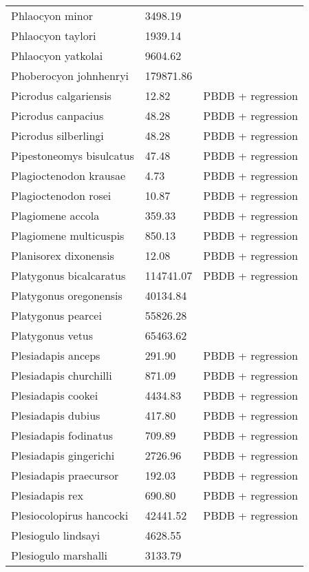 \documentclass{article}
\begin{document}
\begin{center}
\begin{longtable}{p{} p{} p{} }
  Phlaocyon minor & 3498.19 & \cite{Tomiya2013} \\ 
  Phlaocyon taylori & 1939.14 & \cite{Tomiya2013} \\ 
  Phlaocyon yatkolai & 9604.62 & \cite{Tomiya2013} \\ 
  Phoberocyon johnhenryi & 179871.86 & \cite{Tomiya2013} \\ 
  Picrodus calgariensis & 12.82 & PBDB + regression \\ 
  Picrodus canpacius & 48.28 & PBDB + regression \\ 
  Picrodus silberlingi & 48.28 & PBDB + regression \\ 
  Pipestoneomys bisulcatus & 47.48 & PBDB + regression \\ 
  Plagioctenodon krausae & 4.73 & PBDB + regression \\ 
  Plagioctenodon rosei & 10.87 & PBDB + regression \\ 
  Plagiomene accola & 359.33 & PBDB + regression \\ 
  Plagiomene multicuspis & 850.13 & PBDB + regression \\ 
  Planisorex dixonensis & 12.08 & PBDB + regression \\ 
  Platygonus bicalcaratus & 114741.07 & PBDB + regression \\ 
  Platygonus oregonensis & 40134.84 & \cite{Tomiya2013} \\ 
  Platygonus pearcei & 55826.28 & \cite{Tomiya2013} \\ 
  Platygonus vetus & 65463.62 & \cite{Brook2004a} \\ 
  Plesiadapis anceps & 291.90 & PBDB + regression \\ 
  Plesiadapis churchilli & 871.09 & PBDB + regression \\ 
  Plesiadapis cookei & 4434.83 & PBDB + regression \\ 
  Plesiadapis dubius & 417.80 & PBDB + regression \\ 
  Plesiadapis fodinatus & 709.89 & PBDB + regression \\ 
  Plesiadapis gingerichi & 2726.96 & PBDB + regression \\ 
  Plesiadapis praecursor & 192.03 & PBDB + regression \\ 
  Plesiadapis rex & 690.80 & PBDB + regression \\ 
  Plesiocolopirus hancocki & 42441.52 & PBDB + regression \\ 
  Plesiogulo lindsayi & 4628.55 & \cite{Tomiya2013} \\ 
  Plesiogulo marshalli & 3133.79 & \cite{Tomiya2013} \\ 

\end{longtable}
\end{center}
\end{document}

